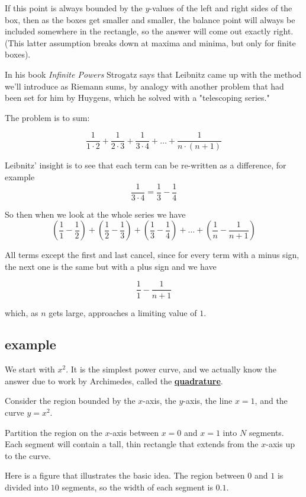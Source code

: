 \documentclass[11pt, oneside]{article}   	%
\begin{document}
If this point is always bounded by the $y$-values of the left and right sides of the box, then as the boxes get smaller and smaller, the balance point will always be included somewhere in the rectangle, so the answer will come out exactly right.  (This latter assumption breaks down at maxima and minima, but only for finite boxes).

In his book \emph{Infinite Powers} Strogatz says that Leibnitz came up with the method we'll introduce as Riemann sums, by analogy with another problem that had been set for him by Huygens, which he solved with a "telescoping series."

The problem is to sum:

\[ \frac{1}{1 \cdot 2} + \frac{1}{2 \cdot 3} + \frac{1}{3 \cdot 4} + \dots + \frac{1}{n \cdot (n + 1)} \]

Leibnitz' insight is to see that each term can be re-written as a difference, for example
\[ \frac{1}{3 \cdot 4} = \frac{1}{3} - \frac{1}{4} \]

So then when we look at the whole series we have
\[ (\frac{1}{1} - \frac{1}{2}) + (\frac{1}{2} - \frac{1}{3}) + (\frac{1}{3} - \frac{1}{4}) + \dots + (\frac{1}{n} - \frac{1}{n+1}) \]

All terms except the first and last cancel, since for every term with a minus sign, the next one is the same but with a plus sign and we have

\[ \frac{1}{1} - \frac{1}{n+1} \]

which, as $n$ gets large, approaches a limiting value of $1$.

\subsection*{example}

We start with $x^2$.  It is the simplest power curve, and we actually know the answer due to work by Archimedes, called the \hyperref[sec:quad]{\textbf{quadrature}}.

Consider the region bounded by the $x$-axis, the $y$-axis, the line $x=1$, and the curve $y=x^2$.  

Partition the region on the $x$-axis between $x=0$ and $x=1$ into $N$ segments.  Each segment will contain a tall, thin rectangle that extends from the $x$-axis up to the curve.  

Here is a figure that illustrates the basic idea.  The region between $0$ and $1$ is divided into $10$ segments, so the width of each segment is $0.1$.  
\end{document}
